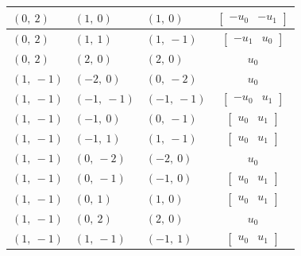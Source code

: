 \documentclass[11pt]{article}
\theoremstyle{definition}
\begin{document}
\begin{longtable}{|l|l|l|c|}
    \hline
    $\left( 0, \  2\right)$ & $\left( 1, \  0\right)$ & $\left( 1, \  0\right)$ & $\left[\begin{matrix}- u_{0} & - u_{1}\end{matrix}\right]$ \\
    \hline
    $\left( 0, \  2\right)$ & $\left( 1, \  1\right)$ & $\left( 1, \  -1\right)$ & $\left[\begin{matrix}- u_{1} & u_{0}\end{matrix}\right]$ \\
    \hline
    $\left( 0, \  2\right)$ & $\left( 2, \  0\right)$ & $\left( 2, \  0\right)$ & $u_{0}$ \\
    \hline
    $\left( 1, \  -1\right)$ & $\left( -2, \  0\right)$ & $\left( 0, \  -2\right)$ & $u_{0}$ \\
    \hline
    $\left( 1, \  -1\right)$ & $\left( -1, \  -1\right)$ & $\left( -1, \  -1\right)$ & $\left[\begin{matrix}- u_{0} & u_{1}\end{matrix}\right]$ \\
    \hline
    $\left( 1, \  -1\right)$ & $\left( -1, \  0\right)$ & $\left( 0, \  -1\right)$ & $\left[\begin{matrix}u_{0} & u_{1}\end{matrix}\right]$ \\
    \hline
    $\left( 1, \  -1\right)$ & $\left( -1, \  1\right)$ & $\left( 1, \  -1\right)$ & $\left[\begin{matrix}u_{0} & u_{1}\end{matrix}\right]$ \\
    \hline
    $\left( 1, \  -1\right)$ & $\left( 0, \  -2\right)$ & $\left( -2, \  0\right)$ & $u_{0}$ \\
    \hline
    $\left( 1, \  -1\right)$ & $\left( 0, \  -1\right)$ & $\left( -1, \  0\right)$ & $\left[\begin{matrix}u_{0} & u_{1}\end{matrix}\right]$ \\
    \hline
    $\left( 1, \  -1\right)$ & $\left( 0, \  1\right)$ & $\left( 1, \  0\right)$ & $\left[\begin{matrix}u_{0} & u_{1}\end{matrix}\right]$ \\
    \hline
    $\left( 1, \  -1\right)$ & $\left( 0, \  2\right)$ & $\left( 2, \  0\right)$ & $u_{0}$ \\
    \hline
    $\left( 1, \  -1\right)$ & $\left( 1, \  -1\right)$ & $\left( -1, \  1\right)$ & $\left[\begin{matrix}u_{0} & u_{1}\end{matrix}\right]$ \\

\end{longtable}
\end{document}
